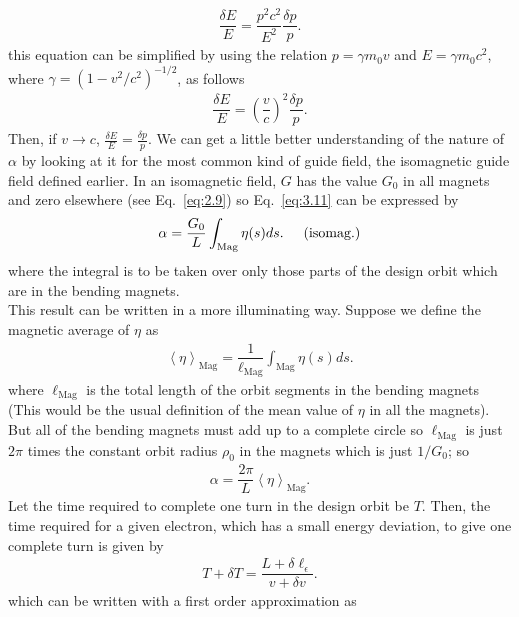 \begin{align}
	\dfrac{\delta E}{E} = \dfrac{p^2 c^2}{E^2} \dfrac{\delta p}{p}.
\end{align}
this equation can be simplified by using the relation $p = \gamma m_0 v$ and $E = \gamma m_0 c^2$, where $\gamma = (1 - v^2/c^2)^{-1/2}$, as follows
\begin{align}\label{eq:E=P}
	\dfrac{\delta E}{E} = \left( \dfrac{v}{c} \right)^2 \dfrac{\delta p}{p}.
\end{align}
Then, if $v \to c$, $\frac{\delta E}{E} = \frac{\delta p}{p}$.
We can get a little better understanding of the nature of $\alpha$ by looking at it for the most common kind of guide field, the isomagnetic guide field defined earlier. In an isomagnetic field, $G$ has the value $G_0$ in all magnets and zero elsewhere (see Eq.~\eqref{eq:2.9}) so Eq.~\eqref{eq:3.11} can be expressed by
\begin{align} \label{eq:3.12}
	\alpha = \dfrac{G_0}{L} \int_{\text{Mag}} \eta(s) ds. \hspace{5mm} \text{(isomag.)}
\end{align}
where the integral is to be taken over only those parts of the design orbit which
are in the bending magnets.\\
This result can be written in a more illuminating way. Suppose we define the magnetic average of $\eta$ as
\begin{align} \label{eq:3.13}
	\left\langle \eta \right\rangle_{\text{Mag}} = \dfrac{1}{\ell_{\text{Mag}}} \int_{\text{Mag}} \eta(s) ds.
\end{align}
where $\ell_{\text{Mag}}$ is the total length of the orbit segments in the bending magnets (This would be the usual definition of the mean value of $\eta$ in all the magnets).
But all of the bending magnets must add up to a complete circle so $\ell_{\text{Mag}}$ is just $2\pi$ times the constant orbit radius $\rho_0$ in the magnets which is just $1/G_0$; so
\begin{align} \label{eq:3.14}
	\alpha = \dfrac{2\pi}{L} \left\langle \eta \right\rangle_{\text{Mag}}.
\end{align}
Let the time required to complete one turn in the design orbit be $T$. Then, the time required for a given electron, which has a small energy deviation, to give one complete turn is given by
\begin{align}
	T + \delta T = \dfrac{L + \delta \ell_\epsilon}{v + \delta v}.
\end{align}
which can be written with a first order approximation as
